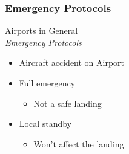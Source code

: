 \subsubsection{Emergency Protocols}
\begin{frame}{Airports in General\\\textit{Emergency Protocols}}{}
	\begin{itemize}
		\item Aircraft accident on Airport
		\item Full emergency
			\begin{itemize}
				\item Not a safe landing
			\end{itemize}
		\item Local standby
			\begin{itemize}
				\item Won't affect the landing
			\end{itemize}
	\end{itemize}
\end{frame}